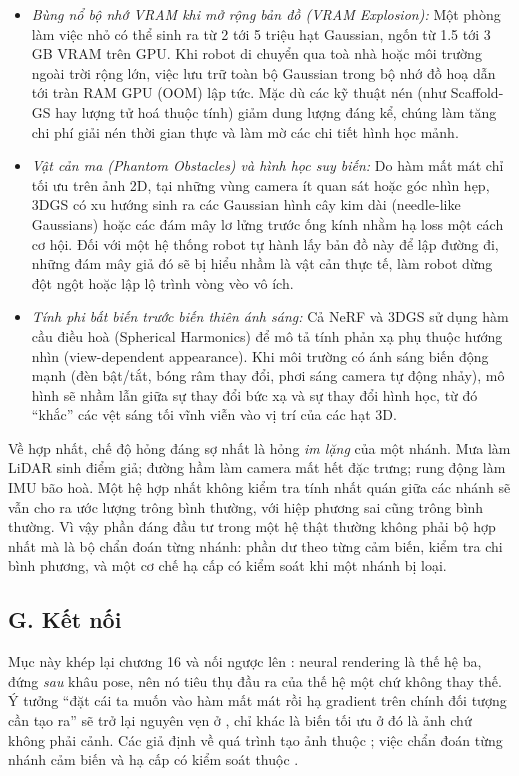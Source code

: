 \documentclass[../../../deep_learning.tex]{subfiles}
\begin{document}
\begin{itemize}
\item \emph{Bùng nổ bộ nhớ VRAM khi mở rộng bản đồ (VRAM Explosion):} Một phòng làm việc nhỏ có thể sinh ra từ 2 tới 5 triệu hạt Gaussian, ngốn từ 1.5 tới 3\,GB VRAM trên GPU. Khi robot di chuyển qua toà nhà hoặc môi trường ngoài trời rộng lớn, việc lưu trữ toàn bộ Gaussian trong bộ nhớ đồ hoạ dẫn tới tràn RAM GPU (OOM) lập tức. Mặc dù các kỹ thuật nén (như Scaffold-GS hay lượng tử hoá thuộc tính) giảm dung lượng đáng kể, chúng làm tăng chi phí giải nén thời gian thực và làm mờ các chi tiết hình học mảnh.
\item \emph{Vật cản ma (Phantom Obstacles) và hình học suy biến:} Do hàm mất mát chỉ tối ưu trên ảnh 2D, tại những vùng camera ít quan sát hoặc góc nhìn hẹp, 3DGS có xu hướng sinh ra các Gaussian hình cây kim dài (needle-like Gaussians) hoặc các đám mây lơ lửng trước ống kính nhằm hạ loss một cách cơ hội. Đối với một hệ thống robot tự hành lấy bản đồ này để lập đường đi, những đám mây giả đó sẽ bị hiểu nhầm là vật cản thực tế, làm robot dừng đột ngột hoặc lập lộ trình vòng vèo vô ích.
\item \emph{Tính phi bất biến trước biến thiên ánh sáng:} Cả NeRF và 3DGS sử dụng hàm cầu điều hoà (Spherical Harmonics) để mô tả tính phản xạ phụ thuộc hướng nhìn (view-dependent appearance). Khi môi trường có ánh sáng biến động mạnh (đèn bật/tắt, bóng râm thay đổi, phơi sáng camera tự động nhảy), mô hình sẽ nhầm lẫn giữa sự thay đổi bức xạ và sự thay đổi hình học, từ đó ``khắc'' các vệt sáng tối vĩnh viễn vào vị trí của các hạt 3D.
\end{itemize}

Về hợp nhất, chế độ hỏng đáng sợ nhất là hỏng \emph{im lặng} của một nhánh. Mưa làm LiDAR sinh điểm giả; đường hầm làm camera mất hết đặc trưng; rung động làm IMU bão hoà. Một hệ hợp nhất không kiểm tra tính nhất quán giữa các nhánh sẽ vẫn cho ra ước lượng trông bình thường, với hiệp phương sai cũng trông bình thường. Vì vậy phần đáng đầu tư trong một hệ thật thường không phải bộ hợp nhất mà là bộ chẩn đoán từng nhánh: phần dư theo từng cảm biến, kiểm tra chi bình phương, và một cơ chế hạ cấp có kiểm soát khi một nhánh bị loại.

\subsection{G. Kết nối}
Mục này khép lại chương 16 và nối ngược lên : neural rendering là thế hệ ba, đứng \emph{sau} khâu pose, nên nó tiêu thụ đầu ra của thế hệ một chứ không thay thế. Ý tưởng ``đặt cái ta muốn vào hàm mất mát rồi hạ gradient trên chính đối tượng cần tạo ra'' sẽ trở lại nguyên vẹn ở , chỉ khác là biến tối ưu ở đó là ảnh chứ không phải cảnh. Các giả định về quá trình tạo ảnh thuộc ; việc chẩn đoán từng nhánh cảm biến và hạ cấp có kiểm soát thuộc .
\end{document}
